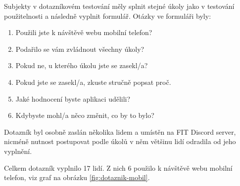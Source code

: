 \par Subjekty v dotazníkovém testování měly splnit stejné úkoly jako v testování použitelnosti a následně vyplnit formulář. Otázky ve formuláři byly:
\begin{enumerate}
    \item Použili jste k návštěvě webu mobilní telefon?
    \item Podařilo se vám zvládnout všechny úkoly?
    \item Pokud ne, u kterého úkolu jste se zasekl/a?
    \item Pokud jste se zasekl/a, zkuste stručně popsat proč.
    \item Jaké hodnocení byste aplikaci udělili?
    \item Kdybyste mohl/a něco změnit, co by to bylo?
\end{enumerate}

Dotazník byl osobně zaslán několika lidem a umístěn na FIT Discord server, nicméně nutnost postupovat podle úkolů v něm většinu lidí odradila od jeho vyplnění. \\

\par Celkem dotazník vyplnilo 17 lidí. Z nich 6 použilo k návštěvě webu mobilní telefon, viz graf na obrázku \ref{fig:dotaznik-mobil}. 


